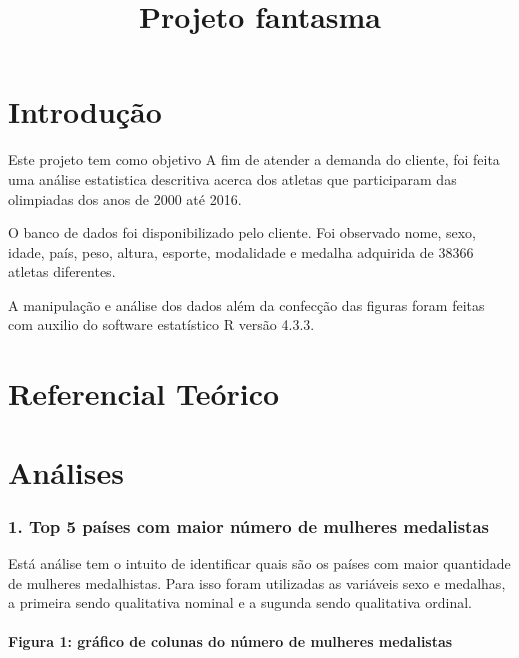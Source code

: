 \documentclass[
  letterpaper,
  DIV=11,
  numbers=noendperiod]{scrartcl}
\title{Projeto fantasma}
\author{}
\date{}
\let\oldparagraph\paragraph
\renewcommand{\paragraph}[1]{\oldparagraph{#1}\mbox{}}
\begin{document}
\maketitle

\section{Introdução}\label{introduuxe7uxe3o}

Este projeto tem como objetivo A fim de atender a demanda do cliente,
foi feita uma análise estatistica descritiva acerca dos atletas que
participaram das olimpiadas dos anos de 2000 até 2016.

O banco de dados foi disponibilizado pelo cliente. Foi observado nome,
sexo, idade, país, peso, altura, esporte, modalidade e medalha adquirida
de 38366 atletas diferentes.

A manipulação e análise dos dados além da confecção das figuras foram
feitas com auxilio do software estatístico R versão 4.3.3.

\section{Referencial Teórico}\label{referencial-teuxf3rico}

\section{Análises}\label{anuxe1lises}

\subsubsection{1. Top 5 países com maior número de mulheres
medalistas}\label{top-5-pauxedses-com-maior-nuxfamero-de-mulheres-medalistas}

Está análise tem o intuito de identificar quais são os países com maior
quantidade de mulheres medalhistas. Para isso foram utilizadas as
variáveis sexo e medalhas, a primeira sendo qualitativa nominal e a
sugunda sendo qualitativa ordinal.

\paragraph{Figura 1: gráfico de colunas do número de mulheres
medalistas}\label{figura-1-gruxe1fico-de-colunas-do-nuxfamero-de-mulheres-medalistas}
\end{document}
